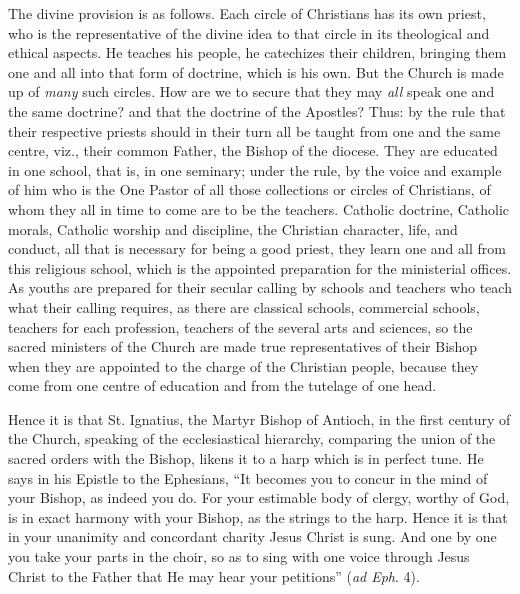 The divine provision is as follows. Each circle
of Christians has its own priest, who is the representative of
the divine idea to that circle in its theological and ethical aspects.
He teaches his people, he catechizes their children, bringing them one
and all into that form of doctrine, which is his own. But the Church
is made up of \emph{many} such circles. How are we to secure that they
may \emph{all} speak one and the same doctrine? and that the doctrine
of the Apostles? Thus: by the rule that their respective priests
should in their turn all be taught from one and the same centre, viz.,
their common Father, the Bishop of the diocese. They are educated in
one school, that is, in one seminary; under the rule, by the voice and
example of him who is the One Pastor of all those collections or
circles of Christians, of whom they all in time to come are to be the
teachers. Catholic doctrine, Catholic morals, Catholic worship and
discipline, the Christian character, life, and conduct, all that is
necessary for being a good priest, they learn one and all from this
religious school, which is the appointed preparation for the
ministerial offices. As youths are prepared for their secular calling
by schools and teachers who teach what their calling requires, as
there are classical schools, commercial schools, teachers for each
profession, teachers of the several arts and sciences, so the sacred
ministers of the Church are made true representatives of their Bishop
when they are appointed to the charge of the Christian people, because
they come from one centre of education and from the tutelage of one
head.

Hence it is that St. Ignatius, the Martyr Bishop
of Antioch, in the first century of the Church, speaking of the
ecclesiastical hierarchy, comparing the union of the sacred orders
with the Bishop, likens it to a harp which is in perfect tune. He says
in his Epistle to the Ephesians, ``It becomes you to concur in the
mind of your Bishop, as indeed you do. For your estimable body of
clergy, worthy of God, is in exact harmony with your Bishop, as the
strings to the harp. Hence it is that in your unanimity and concordant
charity Jesus Christ is sung. And one by one you take your parts in
the choir, so as to sing with one voice through Jesus Christ to the
Father that He may hear your petitions'' (\emph{ad Eph}. 4).

